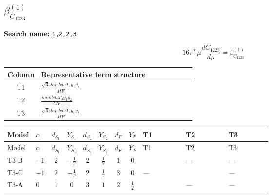 \documentclass[8pt]{article}
\begin{document}
\begin{landscape}
\section*{$\beta_{C_{1223}}^{(1)}$}
\noindent\textbf{Search name: }\texttt{1,2,2,3}\par\smallskip
\[16\pi^2\,\mu\frac{d C_{1223}}{d\mu}=\beta_{C_{1223}}^{(1)}\]
\begin{center}
\begin{tabular}{@{}c >{\raggedright\arraybackslash}p{0.82\linewidth}@{}}
\toprule
Column & Representative term structure \\
\midrule
T1 & \(\displaystyle \frac{\sqrt{3} i lambdaT_{3} \overline{y_{1}} \overline{y_{2}}}{MF}\) \\
\midrule
T2 & \(\displaystyle \frac{i lambdaT_{3} \overline{y_{1}} \overline{y_{2}}}{MF}\) \\
\midrule
T3 & \(\displaystyle \frac{\sqrt{6} i lambdaT_{3} \overline{y_{1}} \overline{y_{2}}}{MF}\) \\
\midrule
\bottomrule
\end{tabular}
\end{center}
\smallskip
\tiny
\begin{longtable}{@{}llcccccc >{\raggedright\arraybackslash}p{0.21\linewidth} >{\raggedright\arraybackslash}p{0.21\linewidth} >{\raggedright\arraybackslash}p{0.21\linewidth}@{}}
\toprule
Model & $\alpha$ & $d_{S_1}$ & $Y_{S_1}$ & $d_{S_2}$ & $Y_{S_2}$ & $d_F$ & $Y_F$ & T1 & T2 & T3 \\
\midrule
\endfirsthead
\toprule
Model & $\alpha$ & $d_{S_1}$ & $Y_{S_1}$ & $d_{S_2}$ & $Y_{S_2}$ & $d_F$ & $Y_F$ & T1 & T2 & T3 \\
\midrule
\endhead
T3-B & $-1$ & $2$ & $-\frac{1}{2}$ & $2$ & $\frac{1}{2}$ & $1$ & $0$ & \scriptsize\adjustbox{max width=\linewidth}{$\begin{gathered} - \frac{\sqrt{3} i lambdaT_{3} \overline{y_{1}} \overline{y_{2}}}{3 MF}\end{gathered}$} & --- & --- \\
\midrule
T3-C & $-1$ & $2$ & $-\frac{1}{2}$ & $2$ & $\frac{1}{2}$ & $3$ & $0$ & --- & \scriptsize\adjustbox{max width=\linewidth}{$\begin{gathered} \frac{i lambdaT_{3} \overline{y_{1}} \overline{y_{2}}}{3 MF}\end{gathered}$} & --- \\
\midrule
T3-A & $0$ & $1$ & $0$ & $3$ & $1$ & $2$ & $\frac{1}{2}$ & \scriptsize\adjustbox{max width=\linewidth}{$\begin{gathered} - \frac{\sqrt{3} i lambdaT_{3} \overline{y_{1}} \overline{y_{2}}}{3 MF}\end{gathered}$} & --- & --- \\

\end{longtable}
\end{landscape}
\end{document}
